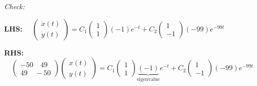 \documentclass[a4paper,12pt]{report}
\begin{document}
	\bigskip
	\bigskip
	
	\textit{Check:}
	
		\begin{center}
		\medskip
		\textbf{LHS: }$ \quad
		\begin{pmatrix}
			\dot{x}(t)\\
			\dot{y}(t)
		\end{pmatrix}
			= C_1 \!
		\begin{pmatrix}
			1 \\
			1
		\end{pmatrix}
			\! (-1) e^{-t} + C_2 \!
		\begin{pmatrix}
			1 \\
			-1
		\end{pmatrix}
			\! (-99) e^{-99t}
		$\\
		\bigskip

		\textbf{RHS: }$ \quad
		\begin{pmatrix}
			-50 \quad 49\\
			49 \quad -50
		\end{pmatrix}
		\begin{pmatrix}
			x(t) \\
			y(t)
		\end{pmatrix}
		= C_1 \!
		\begin{pmatrix}
			1 \\
			1
		\end{pmatrix}
			\! \!\!\! \underbrace{(-1)}_{\text{eigenvalue}} \!\!\!  e^{-t} + C_2 \!
		\begin{pmatrix}
			1 \\
			-1
		\end{pmatrix}
			\! (-99) e^{-99t}
		$

	\end{center}
	
	
	
\end{document}
